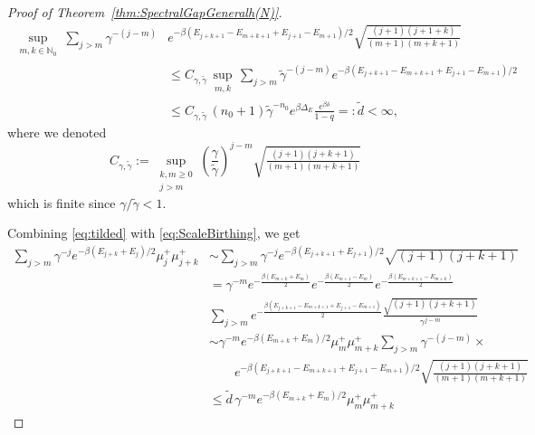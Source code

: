 \documentclass[11pt]{amsart}
\newcommand{\nn}{\nonumber}
\newcommand{\1}{\mathbbm{1}}
\newcommand{\N}{\mathbb{N}}
\newcommand{\bin}[1]{}
\theoremstyle{plain}
\theoremstyle{definition}
\theoremstyle{remark}
\numberwithin{equation}{section}
\begin{document}
\begin{proof}[Proof of Theorem~\ref{thm:SpectralGapGeneralh(N)}]
\begin{align} 
\label{eq:tilded}\sup_{\substack{m,k\in\N_0}}\sum_{j>m}  \gamma^{-(j-m)}  &e^{-\beta(E_{j+k+1}-E_{m+k+1}+E_{j+1} -E_{m+1})/2} \sqrt{\tfrac{(j+1)(j+1+k)}{(m+1)(m+k+1)}}\\
&\le C_{\gamma,\tilde \gamma}\sup_{\substack{m,k}}\!
\sum_{j>m}\! \! \tilde \gamma^{-(j-m)}  
e^{-\beta(E_{j+k+1}-E_{m+k+1}+E_{j+1} -E_{m+1})/2} 
\nn\\
&\nn\le C_{\gamma,\tilde \gamma}\,(n_0+1)\tilde\gamma^{-n_0}e^{\beta\Delta_E}\frac{e^{\beta\delta}}{1-q}=:\tilde{d} < \infty,
\end{align}
where we denoted $$C_{\gamma,\tilde\gamma}:=\sup _{\substack{k,m\ge 0\\j>m}}\left(\frac{\gamma}{\tilde\gamma}\right)^{j-m}\sqrt{\tfrac{(j+1)(j+k+1)}{(m+1)(m+k+1)}}$$ which is finite since $\gamma/\tilde\gamma < 1.$
\bin{Since further also \begin{align}
    &\max_{m+k<n_0}\sum_{j>m}  \gamma^{-(j-m)}  e^{-\beta(E_{j+k+1}-E_{m+k+1}+E_{j+1} -E_{m+1})/2} \times\\&\quad\quad\nn\sqrt{\tfrac{(j+1)(j+1+k)}{(m+1(m+k+1)}} \\ &\le\sup_{m,k}\sum_{j\ge m+1}  \gamma^{-(j-m)}  e^{-\beta(E_{j} -E_{m+1})/2} \sqrt{\tfrac{(j+1)(j+k+1)}{(m+1)(m+k+1)}} <\infty
\end{align}
we see using \eqref{eq:tilded} that
\begin{align*} 
\nn\tilde d&:=\sup_{m,k}\sum_{j>m}  \gamma^{-(j-m)}  e^{-\beta(E_{j+k+1}-E_{m+k+1}+E_{j+1} -E_{m+1})/2} \times\\&\quad\quad\nn\times \sqrt{\tfrac{(j+1)(j+1+k)}{(m+1(m+k+1)}}<\infty.
\end{align*}}
Combining \eqref{eq:tilded} with \eqref{eq:ScaleBirthing}, we get
\begin{align*}
    \sum_{j>m} \gamma^{-j}e^{-\beta(E_{j+k}+E_j)/2} \mu^+_j\mu^+_{j+k}&\sim \sum_{j>m} \gamma^{-j}e^{-\beta(E_{j+k+1}+E_{j+1})/2} \sqrt{(j+1)(j+k+1)}\\& = \gamma^{-m} e^{-\tfrac{\beta(E_{m+k}+E_m)}{2}} e^{-\tfrac{\beta(E_{m+1}-E_m)}{2}} e^{-\tfrac{\beta(E_{m+k+1}-E_{m+k})}{2}}\\
    &\sum_{j>m}  e^{-\tfrac{\beta(E_{j+k+1}-E_{m+k+1}+E_{j+1} -E_{m+1})}{2}} \! \frac{\sqrt{(j+1)(j+k+1)}}{\gamma^{j-m}}  \\ 
    &\sim \gamma^{-m}e^{-\beta(E_{m+k}+E_m)/2}\mu^+_{m}\mu^+_{m+k}  \sum_{j>m}  \gamma^{-(j-m)} \times \\
    &\qquad e^{-\beta(E_{j+k+1}-E_{m+k+1}+E_{j+1} -E_{m+1})/2} \sqrt{\tfrac{(j+1)(j+k+1)}{(m+1)(m+k+1)}} \\&\le \tilde d\, \gamma^{-m}e^{-\beta(E_{m+k}+E_m)/2}\mu^+_{m}\mu^+_{m+k}

\end{align*}
\end{proof}
\end{document}
